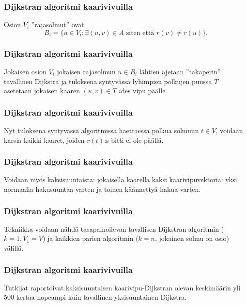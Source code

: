 \documentclass{beamer}
\begin{document}
\begin{frame}
  \frametitle{Dijkstran algoritmi kaarivivuilla}
  Osion $V_i$ ''rajasolmut'' ovat \[
    B_i = \{ u \in V_i \colon \exists (u, v) \in A \text{ siten että } r(v) \neq r(u) \}.
  \]
\end{frame}

\begin{frame}
  \frametitle{Dijkstran algoritmi kaarivivuilla}
  Jokaisen osion $V_i$ jokaisen rajasolmun $u \in B_i$ lähtien ajetaan ''takaperin'' tavallinen Dijkstra ja tuloksena syntyvässä lyhimpien polkujen puussa $T$ asetetaan jokaisen kaaren $(u, v) \in T$ $i$des vipu päälle.
\end{frame}

\begin{frame}
  \frametitle{Dijkstran algoritmi kaarivivuilla}
  Nyt tuloksena syntyvässä algoritmissa haettaessa polkua solmuun $t \in V$, voidaan karsia kaikki kaaret, joiden $r(t)$:s bitti ei ole päällä.
\end{frame}

\begin{frame}
  \frametitle{Dijkstran algoritmi kaarivivuilla}
  Voidaan myös kaksisuuntaista: jokaisella kaarella kaksi kaarivipuvektoria: yksi normaalia hakusuuntaa varten ja toinen käännettyä hakua varten.
\end{frame}

\begin{frame}
  \frametitle{Dijkstran algoritmi kaarivivuilla}
  Tekniikka voidaan nähdä tasapainoilevan tavallisen Dijkstran algoritmin ($k = 1, V_1 = V$) ja kaikkien parien algoritmin ($k = n$, jokainen solmu on osio) välillä.
\end{frame}

\begin{frame}
  \frametitle{Dijkstran algoritmi kaarivivuilla}
  Tutkijat raportoivat kaksisuuntaisen kaarivipu-Dijkstran olevan keskimäärin yli 500 kertaa nopeampi kuin tavallinen yksisuuntainen Dijkstra.
\end{frame}
\end{document}
